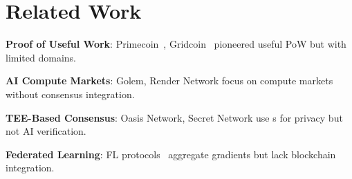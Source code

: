 \section{Related Work}


\textbf{Proof of Useful Work}: Primecoin~\cite{king2013primecoin}, Gridcoin~\cite{gridcoin2014} pioneered useful PoW but with limited domains.

\textbf{AI Compute Markets}: Golem, Render Network focus on compute markets without consensus integration.

\textbf{TEE-Based Consensus}: Oasis Network, Secret Network use \TEE{}s for privacy but not AI verification.

\textbf{Federated Learning}: FL protocols~\cite{mcmahan2017communication} aggregate gradients but lack blockchain integration.

